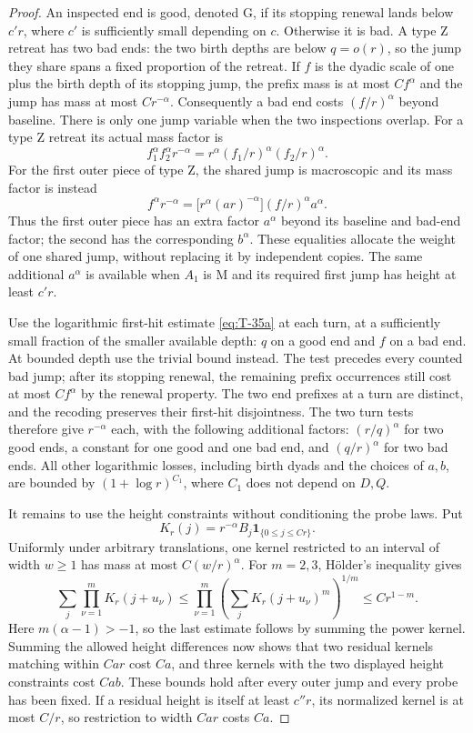 \begin{proof}
An inspected end is good, denoted $\mathrm G$, if its stopping renewal
lands below $c'r$, where $c'$ is sufficiently small depending on $c$.
Otherwise it is bad. A type $\mathrm Z$ retreat has two bad ends:
the two birth depths are below $q=o(r)$, so the jump they share spans
a fixed proportion of the retreat. If $f$ is the dyadic scale of one plus the birth
depth of its stopping jump, the prefix mass is at most $Cf^\alpha$ and
the jump has mass at most $Cr^{-\alpha}$. Consequently a bad end costs
$(f/r)^\alpha$ beyond baseline. There is only one jump variable when the two
inspections overlap.
For a type $\mathrm Z$ retreat its actual mass factor is
\[
 f_1^\alpha f_2^\alpha r^{-\alpha}
 =r^\alpha(f_1/r)^\alpha(f_2/r)^\alpha.
\]
For the first outer piece of type $\mathrm Z$, the shared jump is
macroscopic and its mass factor is instead
\[
 f^\alpha r^{-\alpha}
 =\bigl[r^\alpha(ar)^{-\alpha}\bigr](f/r)^\alpha a^\alpha.
\]
Thus the first outer piece has an extra factor $a^\alpha$ beyond its
baseline and bad-end factor; the second has the corresponding
$b^\alpha$. These equalities allocate the weight of one shared jump,
without replacing it by independent copies. The same additional
$a^\alpha$ is available when $A_1$ is $\mathrm M$ and its required first
jump has height at least $c'r$.

Use the logarithmic first-hit estimate \eqref{eq:T-35a} at each turn,
at a sufficiently small fraction of the smaller available depth: $q$
on a good end and $f$ on a bad end. At bounded depth use the trivial
bound instead. The test precedes every counted bad jump; after its
stopping renewal, the remaining prefix occurrences still cost at most
$Cf^\alpha$ by the renewal property. The two end prefixes at a turn
are distinct, and the recoding preserves their first-hit disjointness.
The two turn tests therefore give $r^{-\alpha}$ each, with the following
additional factors: $(r/q)^\alpha$ for two good ends, a constant for
one good and one bad end, and $(q/r)^\alpha$ for two bad ends. All other
logarithmic losses, including birth dyads and the choices of $a,b$, are
bounded by $(1+\log r)^{C_1}$, where $C_1$ does not depend on $D,Q$.

It remains to use the height constraints without conditioning the
probe laws. Put
\[
 K_r(j)=r^{-\alpha}B_j\mathbf 1_{\{0\le j\le Cr\}}.
\]
Uniformly under arbitrary translations, one kernel restricted to an
interval of width $w\ge1$ has mass at most $C(w/r)^\alpha$.
For $m=2,3$, H\"older's inequality gives
\[
 \sum_j\prod_{\nu=1}^m K_r(j+u_\nu)
 \le \prod_{\nu=1}^m\left(\sum_jK_r(j+u_\nu)^m\right)^{1/m}
 \le C r^{1-m}.
\]
Here $m(\alpha-1)>-1$, so the last estimate follows by summing the
power kernel. Summing the allowed height differences now shows that
two residual kernels matching within $Car$ cost $Ca$, and three
kernels with the two displayed height constraints cost $Cab$.
These bounds hold after every outer jump and every probe has been
fixed. If a residual height is itself at least $c''r$, its normalized
kernel is at most $C/r$, so restriction to width $Car$ costs $Ca$.


\end{proof}
